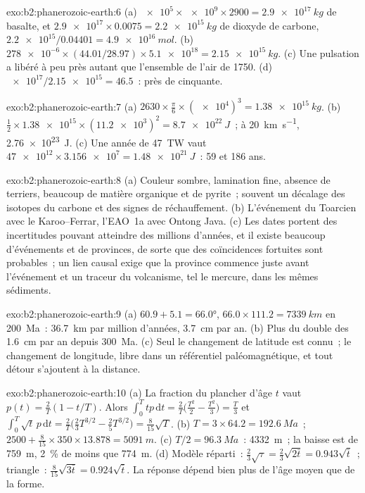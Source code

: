 \begin{solution}{exo:b2:phanerozoic-earth:6}
(a) $\num{e5} \times \num{e9} \times 2900 = \qty{2.9e17}{kg}$ de basalte, et $\num{2.9e17}
\times 0.0075 = \qty{2.2e15}{kg}$ de dioxyde de carbone, $\num{2.2e15}/0.04401 = \qty{4.9e16}{mol}$.
(b) $\num{278e-6} \times (44.01/28.97) \times \num{5.1e18} = \qty{2.15e15}{kg}$. (c) Une pulsation
a libéré à peu près autant que l'ensemble de l'air de 1750. (d) $\num{e17}/\num{2.15e15} = 46.5$~: près de cinquante.
\end{solution}

\begin{solution}{exo:b2:phanerozoic-earth:7}
(a) $2630 \times \frac{\pi}{6} \times (\num{e4})^3 = \qty{1.38e15}{kg}$. (b) $\tfrac12 \times
\num{1.38e15} \times (\num{11.2e3})^2 = \qty{8.7e22}{J}$~; à \qty{20}{km.s^{-1}},
\qty{2.76e23}{J}. (c) Une année de \qty{47}{TW} vaut $\num{47e12} \times \num{3.156e7} =
\qty{1.48e21}{J}$~: 59 et 186 ans.
\end{solution}

\begin{solution}{exo:b2:phanerozoic-earth:8}
(a) Couleur sombre, lamination fine, absence de terriers, beaucoup de matière organique et de pyrite~; souvent
un décalage des isotopes du carbone et des signes de réchauffement. (b) L'événement du Toarcien avec le Karoo--Ferrar, l'EAO~1a avec
Ontong Java. (c) Les dates portent des incertitudes pouvant atteindre des millions d'années, et il existe beaucoup
d'événements et de provinces, de sorte que des coïncidences fortuites sont probables~; un lien causal exige que la province commence
juste avant l'événement et un traceur du volcanisme, tel le mercure, dans les mêmes sédiments.
\end{solution}

\begin{solution}{exo:b2:phanerozoic-earth:9}
(a) $60.9 + 5.1 = \ang{66.0}$, $66.0 \times 111.2 = \qty{7339}{km}$ en \qty{200}{Ma}~:
\qty{36.7}{km} par million d'années, \qty{3.7}{cm} par an. (b) Plus du double des
\qty{1.6}{cm} par an depuis \qty{300}{Ma}. (c) Seul le changement de latitude est connu~; le changement de
longitude, libre dans un référentiel paléomagnétique, et tout détour s'ajoutent à la distance.
\end{solution}

\begin{solution}{exo:b2:phanerozoic-earth:10}
(a) La fraction du plancher d'âge $t$ vaut $p(t) = \frac2T(1 - t/T)$. Alors $\int_0^T tp\,\mathrm{d}t =
\frac2T\bigl(\frac{T^2}2 - \frac{T^2}3\bigr) = \frac T3$ et $\int_0^T \sqrt t\,p\,\mathrm{d}t =
\frac2T\bigl(\frac23 T^{3/2} - \frac25 T^{3/2}\bigr) = \frac8{15}\sqrt T$. (b) $T = 3 \times 64.2 =
\qty{192.6}{Ma}$~; $2500 + \frac8{15} \times 350 \times 13.878 = \qty{5091}{m}$. (c) $T/2 =
\qty{96.3}{Ma}$~: \qty{4332}{m}~; la baisse est de \qty{759}{m}, \qty{2}{\percent} de moins que
\qty{774}{m}. (d) Modèle réparti~: $\frac23\sqrt\tau = \frac23\sqrt{2\bar t} = 0.943\sqrt{\bar t}$~;
triangle~: $\frac8{15}\sqrt{3\bar t} = 0.924\sqrt{\bar t}$. La réponse dépend bien plus de l'âge moyen
que de la forme.
\end{solution}

